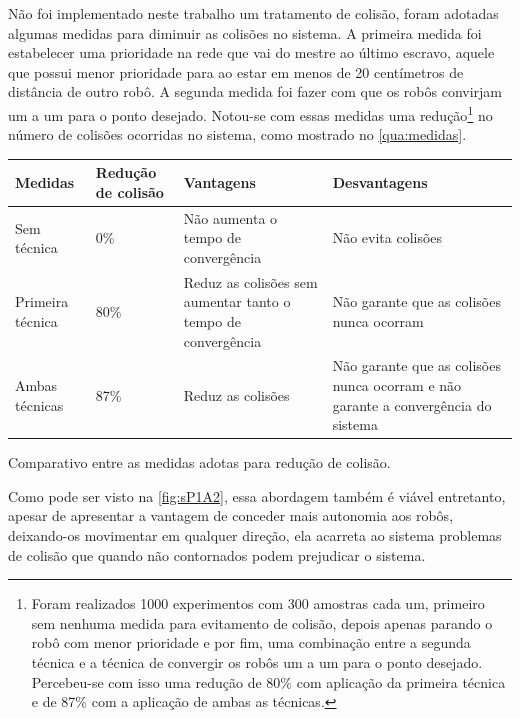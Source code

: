 Não foi implementado neste trabalho um tratamento de colisão, foram adotadas algumas medidas para diminuir as colisões no sistema. A primeira medida foi estabelecer uma prioridade na rede que vai do mestre ao último escravo, aquele que possui menor prioridade para ao estar em menos de 20 centímetros de distância de outro robô. A segunda medida foi fazer com que os robôs convirjam um a um para o ponto desejado. Notou-se com essas medidas uma redução\footnote{Foram realizados 1000 experimentos com 300 amostras cada um, primeiro sem nenhuma medida para evitamento de colisão, depois apenas parando o robô com menor prioridade e por fim, uma combinação entre a segunda técnica e a técnica de convergir os robôs um a um para o ponto desejado. Percebeu-se com isso uma redução de 80\% com aplicação da primeira técnica e de 87\% com a aplicação de ambas as técnicas.} no número de colisões ocorridas no sistema, como mostrado no \autoref{qua:medidas}.
\begin{quadro}[!htb]
	\centering
	\begin{tabular}{|p{2cm}|p{2cm}|p{5cm}|p{5cm}|}
		\hline
		\textbf{Medidas} & \textbf{Redução de colisão} & \textbf{Vantagens} & \textbf{Desvantagens}  \\
		\hline
		Sem técnica & 0\% & Não aumenta o tempo de convergência & Não evita colisões\\
		\hline
		Primeira técnica & 80\% & Reduz as colisões sem aumentar tanto o tempo de convergência & Não garante que as colisões nunca ocorram\\
		\hline
		Ambas técnicas & 87\% & Reduz as colisões & Não garante que as colisões nunca ocorram e não garante a convergência do sistema\\
		\hline
	\end{tabular}
	\caption{Comparativo entre as medidas adotas para redução de colisão.\label{qua:medidas}}
\end{quadro}

Como pode ser visto na \autoref{fig:sP1A2}, essa abordagem também é viável entretanto, apesar de apresentar a vantagem de conceder mais autonomia aos robôs, deixando-os movimentar em qualquer direção, ela acarreta ao sistema problemas de colisão que quando não contornados podem prejudicar o sistema.

